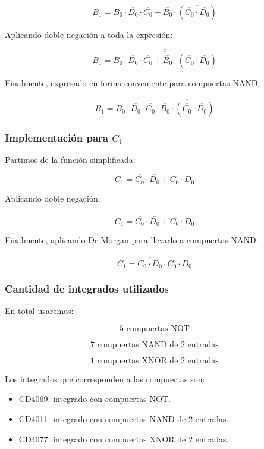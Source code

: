 \documentclass[a4paper,12pt]{article}
\begin{document}
\[
B_1 =
B_0\cdot \overline{D_0}\cdot \overline{C_0}
+
\overline{B_0}\cdot
\left(\overline{\overline{C_0}\cdot \overline{D_0}}\right)
\]

Aplicando doble negación a toda la expresión:

\[
B_1 =
\overline{
	\overline{
		B_0\cdot \overline{D_0}\cdot \overline{C_0}
		+
		\overline{B_0}\cdot
		\left(\overline{\overline{C_0}\cdot \overline{D_0}}\right)
	}
}
\]

Finalmente, expresado en forma conveniente para compuertas NAND:

\[
B_1 =
\overline{
	\overline{B_0\cdot \overline{D_0}\cdot \overline{C_0}}
	\cdot
	\overline{
		\overline{B_0}\cdot
		\left(\overline{\overline{C_0}\cdot \overline{D_0}}\right)
	}
}
\]

\subsubsection{Implementación para $C_1$}

Partimos de la función simplificada:

\[
C_1 = \overline{C_0}\cdot \overline{D_0} + C_0\cdot D_0
\]

Aplicando doble negación:

\[
C_1 =
\overline{
	\overline{
		\overline{C_0}\cdot \overline{D_0} + C_0\cdot D_0
	}
}
\]

Finalmente, aplicando De Morgan para llevarlo a compuertas NAND:

\[
C_1 =
\overline{
	\overline{\overline{C_0}\cdot \overline{D_0}}
	\cdot
	\overline{C_0\cdot D_0}
}
\]

\subsubsection{Cantidad de integrados utilizados}

En total usaremos:

\[
5 \text{ compuertas NOT}
\]

\[
7 \text{ compuertas NAND de 2 entradas}
\]

\[
1 \text{ compuertas XNOR de 2 entradas}
\]


Los integrados que corresponden a las compuertas son:

\begin{itemize}
	\item CD4069: integrado con compuertas NOT.
	\item CD4011: integrado con compuertas NAND de 2 entradas.
	\item CD4077: integrado con compuertas XNOR de 2 entradas.
\end{itemize}
\end{document}
